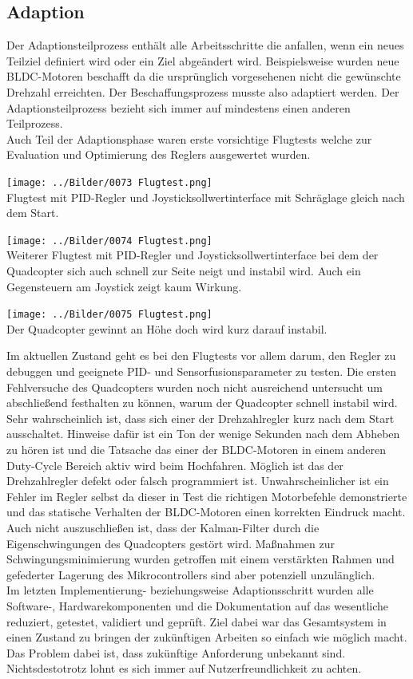 \subsection{Adaption}
Der Adaptionsteilprozess enthält alle Arbeitsschritte die anfallen, wenn ein neues Teilziel definiert wird oder ein Ziel abgeändert wird. Beispielsweise wurden neue BLDC-Motoren beschafft da die ursprünglich vorgesehenen nicht die gewünschte Drehzahl erreichten. Der Beschaffungsprozess musste also adaptiert werden. Der Adaptionsteilprozess bezieht sich immer auf mindestens einen anderen Teilprozess.\\
Auch Teil der Adaptionsphase waren erste vorsichtige Flugtests welche zur Evaluation und Optimierung des Reglers ausgewertet wurden.
\begin{center}
	\texttt{[image: ../Bilder/0073 Flugtest.png]}{\\Flugtest mit PID-Regler und Joysticksollwertinterface mit Schräglage gleich nach dem Start.}
\end{center}
\begin{center}
	\texttt{[image: ../Bilder/0074 Flugtest.png]}{\\Weiterer Flugtest mit PID-Regler und Joysticksollwertinterface bei dem der Quadcopter sich auch schnell zur Seite neigt und instabil wird. Auch ein Gegensteuern am Joystick zeigt kaum Wirkung.}
\end{center}
\begin{center}
	\texttt{[image: ../Bilder/0075 Flugtest.png]}{\\Der Quadcopter gewinnt an Höhe doch wird kurz darauf instabil.}
\end{center}
Im aktuellen Zustand geht es bei den Flugtests vor allem darum, den Regler zu debuggen und geeignete PID- und Sensorfusionsparameter zu testen. Die ersten Fehlversuche des Quadcopters wurden noch nicht ausreichend untersucht um abschließend festhalten zu können, warum der Quadcopter schnell instabil wird. Sehr wahrscheinlich ist, dass sich einer der Drehzahlregler kurz nach dem Start ausschaltet. Hinweise dafür ist ein Ton der wenige Sekunden nach dem Abheben zu hören ist und die Tatsache das einer der BLDC-Motoren in einem anderen Duty-Cycle Bereich aktiv wird beim Hochfahren. Möglich ist das der Drehzahlregler defekt oder falsch programmiert ist. Unwahrscheinlicher ist ein Fehler im Regler selbst da dieser in Test die richtigen Motorbefehle demonstrierte und das statische Verhalten der BLDC-Motoren einen korrekten Eindruck macht. Auch nicht auszuschließen ist, dass der Kalman-Filter durch die Eigenschwingungen des Quadcopters gestört wird. Maßnahmen zur Schwingungsminimierung wurden getroffen mit einem verstärkten Rahmen und gefederter Lagerung des Mikrocontrollers sind aber potenziell unzulänglich.\\
Im letzten Implementierung- beziehungsweise Adaptionsschritt wurden alle Software-, Hardwarekomponenten und die Dokumentation auf das wesentliche reduziert, getestet, validiert und geprüft.
Ziel dabei war das Gesamtsystem in einen Zustand zu bringen der zukünftigen Arbeiten so einfach wie möglich macht. Das Problem dabei ist, dass zukünftige Anforderung unbekannt sind. Nichtsdestotrotz lohnt es sich immer auf Nutzerfreundlichkeit zu achten.
